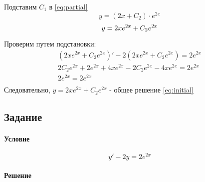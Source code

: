 Подставим $C_1$ в \ref{eq:partial}
\[y = (2x  + C_2) \cdot e^{2x} \]
\begin{equation}
	y = 2xe^{2x}  + C_2e^{2x} \\
	\label{eq:solution}
\end{equation}

Проверим путем подстановки:
\begin{gather*}
	(2xe^{2x}  + C_2e^{2x})' - 2(2xe^{2x}  + C_2e^{2x}) = 2e^{2x} \\
	2C_2e^{2x} + 2e^{2x} + 4xe^{2x} - 2C_2e^{2x} - 4xe^{2x} = 2e^{2x} \\
	2e^{2x} = 2e^{2x} \\
\end{gather*}
Следовательно, $y = 2xe^{2x}  + C_2e^{2x}$ - общее решение \ref{eq:initial}

\subsection{Задание }
\paragraph{Условие}
\[y' - 2y = 2e^{2x}\]
\paragraph{Решение}
\begin{gather*}
\end{gather*}
